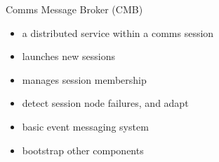 \documentclass[default,pdf,colorBG,slideColor]{prosper}
\begin{document}
\begin{slide}{Comms Message Broker (CMB)}{\small
\begin{itemize}
  \item{a distributed service within a comms session}
  \item{launches new sessions}
  \item{manages session membership}
  \item{detect session node failures, and adapt}
  \item{basic event messaging system}
  \item{bootstrap other components}
\end{itemize}
\begin{minipage}[b]{0.18\linewidth}
\end{minipage}
\hspace{0.5cm}
\begin{minipage}[b]{0.18\linewidth}
\end{minipage}
\hspace{0.5cm}
\begin{minipage}[b]{0.18\linewidth}

\end{minipage}}
\end{slide}
\end{document}
